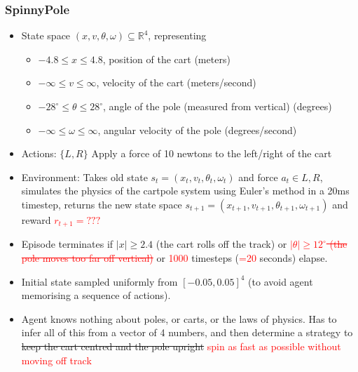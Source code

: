 \documentclass[10pt,a4paper]{beamer}
\newcommand{\red}[1]{\textcolor{red}{#1}}
\begin{document}
\begin{frame}
	\frametitle{SpinnyPole}
	\begin{itemize}
		\item State space $(x, v, \theta, \omega) \subseteq \mathbb{R}^4$, representing
		\begin{itemize}
			\item $-4.8 \leq x \leq 4.8$, position of the cart (meters)
			\item $-\infty \leq v \leq \infty$, velocity of the cart (meters/second)
			\item $-28^\circ \leq \theta \leq 28^\circ$, angle of the pole (measured from vertical) (degrees)
			\item $-\infty \leq \omega \leq \infty$, angular velocity of the pole (degrees/second)  
		\end{itemize}
		\item Actions: $\{L,R\}$ Apply a force of 10 newtons to the left/right of the cart
		\item Environment: Takes old state $s_t = (x_t, v_t, \theta_t, \omega_t)$ and
		force $a_t \in {L,R}$, simulates the physics of the cartpole system using Euler's method
		in a 20ms timestep, returns the new state space 
		$s_{t+1} = (x_{t+1}, v_{t+1}, \theta_{t+1}, \omega_{t+1})$ and reward \red{$r_{t+1} = ???$}
		\item Episode terminates if $|x| \geq 2.4$ (the cart rolls off the track)
		or \red{\sout{$|\theta| \geq 12^\circ$ (the pole moves too far off vertical)}} or \red{1000} timesteps (\red{=20} seconds)
		elapse.
		\item Initial state sampled uniformly from $[-0.05, 0.05]^4$ (to avoid agent memorising 
		a sequence of actions).
		\item Agent knows nothing about poles, or carts, or the laws of physics. Has to infer all of this from
		a vector of 4 numbers, and then determine a strategy to \sout{keep the cart centred and the pole upright}
		\red{spin as fast as possible without moving off track}
	\end{itemize}
\end{frame}
\end{document}
